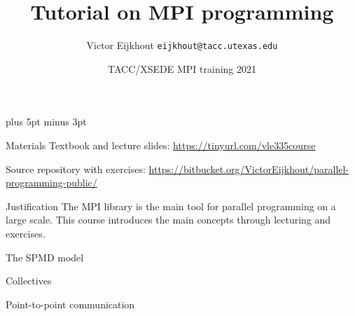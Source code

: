 \documentclass[11pt,headernav]{beamer}
\def\Location{}%
\def\courseyear{2021}
\def\Location{TACC HPC Training \courseyear}
\newcounter{tacc}
\def\Location{TACC/XSEDE MPI training \courseyear}
\def\TitleExtra{}
\begin{document}
\parskip=10pt plus 5pt minus 3pt

\title{Tutorial on MPI programming\TitleExtra}
\author{Victor Eijkhout {\tt eijkhout@tacc.utexas.edu}}
\date{\Location}

\begin{frame}
  \titlepage
\end{frame}

\begin{xsede}
  
\end{xsede}

\begin{frame}{Materials}
  Textbook and lecture slides: \url{https://tinyurl.com/vle335course}

  Source repository with exercises:
  \url{https://bitbucket.org/VictorEijkhout/parallel-programming-public/}
\end{frame}

\begin{frame}{Justification}
  The MPI library is the main tool
  for parallel programming on a large scale.
  This course introduces the main concepts
  through lecturing and exercises.
\end{frame}



\renewcommand\standardversion{3}

 {The SPMD model}


 {Collectives}


 {Point-to-point communication}


\iffalse
\begin{exerciseframe}[serialsend]
  
\end{exerciseframe}
\fi
\end{document}
